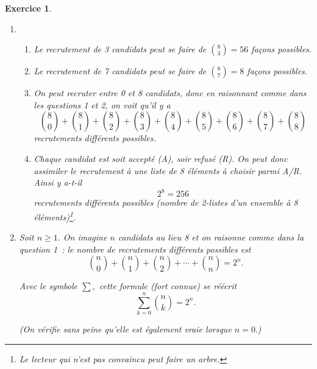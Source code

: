 \documentclass[10pt]{article}
\newtheorem{exo}{Exercice}
\begin{document}
\begin{exo}


\begin{enumerate}
\item 

\begin{enumerate}
\item Le recrutement de 3 candidats peut se faire de $\binom{8}{3}=56$ façons possibles.
\item Le recrutement de 7 candidats peut se faire de $\binom{8}{7}=8$ façons possibles.
\item On peut recruter entre 0 et 8 candidats, donc en raisonnant comme dans les questions 1 et 2, on voit qu'il y a
\[\binom{8}{0}+\binom{8}{1}+\binom{8}{2}+\binom{8}{3}+\binom{8}{4}+\binom{8}{5}+\binom{8}{6}+\binom{8}{7}+\binom{8}{8}\] recrutements différents possibles.
\item Chaque candidat est soit accepté (A), soir refusé (R). On peut donc assimiler le recrutement à une liste de 8 éléments à choisir parmi A/R. Ainsi y a-t-il \[2^8=256\] recrutements différents possibles (nombre de 2-listes d'un ensemble à 8 éléments)\footnote{Le lecteur qui n'est pas convaincu peut faire un arbre.}.
\end{enumerate}
\item Soit $n\geq 1.$ On imagine $n$ candidats au lieu 8 et on raisonne comme dans la question 1~: le nombre de recrutements différents possibles est
\[\binom{n}{0}+\binom{n}{1}+\binom{n}{2}+\cdots +\binom{n}{n}=2^n.\]  

\medskip

Avec le symbole $\sum,$ cette formule (fort connue) se réécrit \[\sum\limits_{k=0}^n\binom{n}{k}=2^n.\]

(On vérifie sans peine qu'elle est également vraie lorsque $n=0.$)

\end{enumerate}

\end{exo}
\end{document}
